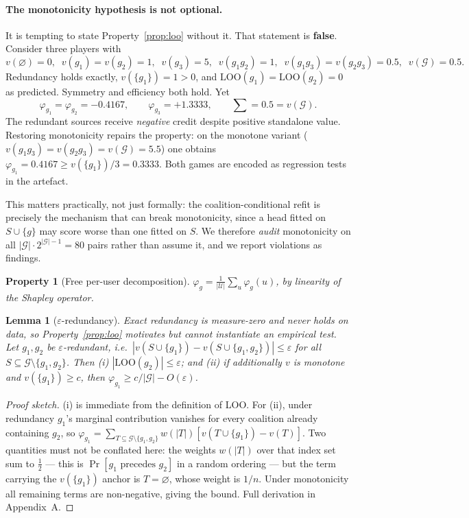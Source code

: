 \documentclass[11pt]{article}
\newtheorem{property}{Property}
\newtheorem{lemma}{Lemma}
\newcommand{\G}{\mathcal{G}}
\newcommand{\LOO}{\mathrm{LOO}}
\begin{document}
\paragraph{The monotonicity hypothesis is not optional.}
It is tempting to state Property~\ref{prop:loo} without it. That statement is
\textbf{false}. Consider three players with
\[
v(\varnothing)=0,\;\; v(g_1)=v(g_2)=1,\;\; v(g_3)=5,\;\;
v(g_1g_2)=1,\;\; v(g_1g_3)=v(g_2g_3)=0.5,\;\; v(\G)=0.5 .
\]
Redundancy holds exactly, $v(\{g_1\}) = 1 > 0$, and
$\LOO(g_1)=\LOO(g_2)=0$ as predicted. Symmetry and efficiency both hold. Yet
\[
\varphi_{g_1} = \varphi_{g_2} = -0.4167, \qquad \varphi_{g_3} = +1.3333,
\qquad \textstyle\sum = 0.5 = v(\G).
\]
The redundant sources receive \emph{negative} credit despite positive
standalone value. Restoring monotonicity repairs the property: on the monotone
variant ($v(g_1g_3)=v(g_2g_3)=v(\G)=5.5$) one obtains
$\varphi_{g_1} = 0.4167 \ge v(\{g_1\})/3 = 0.3333$. Both games are encoded as
regression tests in the artefact.

This matters practically, not just formally: the coalition-conditional refit is
precisely the mechanism that can break monotonicity, since a head fitted on
$S \cup \{g\}$ may score worse than one fitted on $S$. We therefore
\emph{audit} monotonicity on all $|\G| \cdot 2^{|\G|-1} = 80$ pairs rather than
assume it, and we report violations as findings.

\begin{property}[Free per-user decomposition]\label{prop:decomp}
$\varphi_g = \frac{1}{|\mathcal{U}|}\sum_u \varphi_g(u)$, by linearity of the
Shapley operator.
\end{property}

\begin{lemma}[$\varepsilon$-redundancy]\label{lem:eps}
Exact redundancy is measure-zero and never holds on data, so
Property~\ref{prop:loo} motivates but cannot instantiate an empirical test. Let
$g_1,g_2$ be $\varepsilon$-redundant, i.e.\
$|v(S \cup \{g_1\}) - v(S \cup \{g_1,g_2\})| \le \varepsilon$ for all
$S \subseteq \G\setminus\{g_1,g_2\}$. Then
\emph{(i)} $|\LOO(g_2)| \le \varepsilon$; and
\emph{(ii)} if additionally $v$ is monotone and $v(\{g_1\}) \ge c$, then
$\varphi_{g_1} \ge c/|\G| - O(\varepsilon)$.
\end{lemma}

\begin{proof}[Proof sketch]
(i) is immediate from the definition of LOO. For (ii), under redundancy $g_1$'s
marginal contribution vanishes for every coalition already containing $g_2$, so
$\varphi_{g_1} = \sum_{T \subseteq \G\setminus\{g_1,g_2\}} w(|T|)
[v(T\cup\{g_1\}) - v(T)]$. Two quantities must not be conflated here: the
weights $w(|T|)$ over that index set sum to $\tfrac12$ --- this is
$\Pr[g_1 \text{ precedes } g_2]$ in a random ordering --- but the term carrying
the $v(\{g_1\})$ anchor is $T = \varnothing$, whose weight is $1/n$. Under
monotonicity all remaining terms are non-negative, giving the bound. Full
derivation in Appendix~A.
\end{proof}
\end{document}
